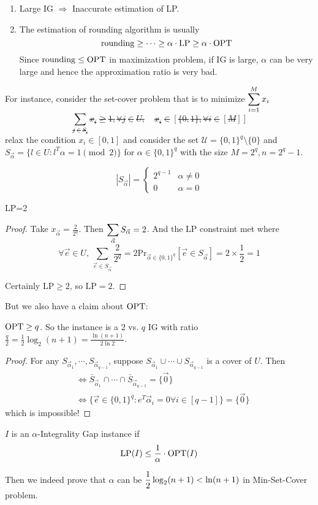 \begin{enumerate}
    \item Large IG $ \Rightarrow  $ Inaccurate estimation of LP.
    \item The estimation of rounding algorithm is usually 
    \[\mathrm{rounding } \geq \cdots \geq \alpha\cdot\mathrm{LP} \geq \alpha\cdot\mathrm{OPT}\]
    Since  $ \mathrm{rounding} \leq \mathrm{OPT} $ in maximization problem, if IG is large,  $ \alpha $ can be very large and hence the approximation ratio is very bad. 
\end{enumerate}

For instance, consider the set-cover problem that is to minimize  $ \displaystyle\sum_{i=1}^M x_i $ \st 
\[\sum_{j\in S_i}x_i \geq 1,\forall j\in U,\quad x_i\in [\{0,1\},\forall i\in [M]]\] 
relax the condition  $ x_i\in [0,1] $ and consider the set  $ \mathcal{U}=\{0,1\}^q\setminus\{0\} $ and  $ S_{\vec{\alpha}}=\{l\in U:l^T\alpha=1\pmod 2\} $ for  $ \alpha\in \{0,1\}^q $ with the size  $  M=2^q,n=2^q-1 $. 

\[|S_{\vec{\alpha}}|=\begin{cases}
    2^{q-1}&\alpha\neq 0\\
    0&\alpha=0
\end{cases}\]

\begin{claim}
    LP=2
\end{claim}
\begin{proof}
    Take  $ x_{\vec{\alpha}}=\frac{2}{2^q} $. Then  $ \displaystyle\sum_{\vec{\alpha}}S_{\vec{\alpha}}=2 $. And the LP constraint met where
    \[\forall \vec{e}\in U,\,\sum_{\vec{e}\in S_{\vec{\alpha}}}\frac{2}{2^q}=2\mathrm{Pr}_{\vec{\alpha}\in \{0,1\}^q}[\vec{e}\in S_{\vec{\alpha}}]=2\times \frac{1}{2}=1\] 
    
    Certainly  $ \mathrm{LP} \geq 2 $, so  $ \mathrm{LP}=2 $.  
\end{proof}

But we also have a claim about  $ \mathrm{OPT} $:

\begin{claim}
     $ \mathrm{OPT} \geq q $. So the instance is a  $ 2 $ vs.  $ q $ IG with ratio  $ \frac{q}{2}=\frac{1}{2}\log_2(n+1)=\frac{\ln(n+1)}{2\ln 2} $.   
\end{claim}
\begin{proof}
    For any  $ S_{\vec{\alpha}_1},\cdots,S_{\vec{\alpha}_{q-1}} $, suppose  $ S_{\vec{\alpha}_1}\cup\cdots\cup S_{\vec{\alpha}_{q-1}} $ is a cover of  $ U $. Then 
    \begin{align*}
        &\Leftrightarrow \bar{S}_{\vec{\alpha}_1}\cap\cdots\cap\bar{S}_{\vec{\alpha}_{q-1}}=\{\vec{0}\}\\
        &\Leftrightarrow\{\vec{e}\in \{0,1\}^q:e^T\vec{\alpha}_i=0\forall i\in [q-1]\}=\{\vec{0}\}
    \end{align*} 
    which is impossible!
\end{proof}

 $ I  $ is an  $ \alpha  $-Integrality Gap instance if 
 \[\mathrm{LP}(I) \leq \frac{1}{\alpha}\cdot\mathrm{OPT}(I)\]


Then we indeed prove that  $ \alpha $ can be  $\displaystyle \frac{1}{2}\log_2(n+1)<\ln(n+1) $  in Min-Set-Cover problem.  

